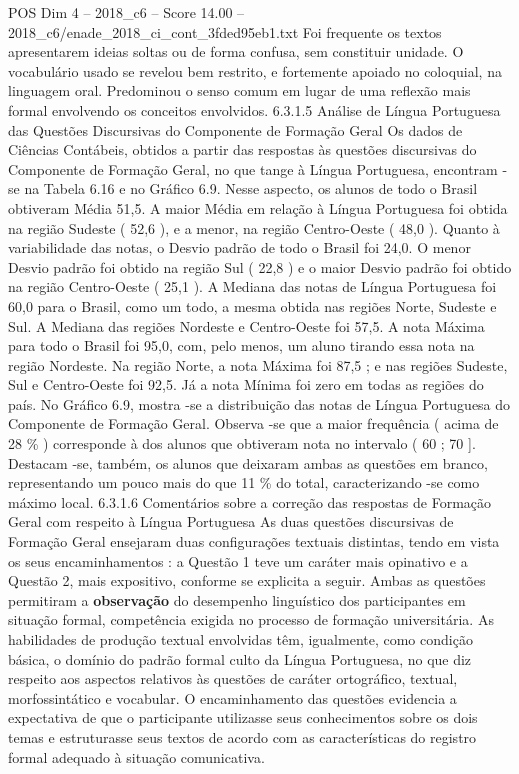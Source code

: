 \begin{textsample}{POS Dim 4 – 2018\_c6 – Score 14.00 – 2018\_c6/enade\_2018\_ci\_cont\_3fded95eb1.txt}
Foi frequente os textos apresentarem ideias soltas ou de forma confusa, sem constituir unidade.
O vocabulário usado se revelou bem restrito, e fortemente apoiado no coloquial, na linguagem oral.
Predominou o senso comum em lugar de uma reflexão mais formal envolvendo os conceitos envolvidos. 6.3.1.5 Análise de Língua Portuguesa das Questões Discursivas do Componente de Formação Geral Os dados de Ciências Contábeis, obtidos a partir das respostas às questões discursivas do Componente de Formação Geral, no que tange à Língua Portuguesa, encontram -se na Tabela 6.16 e no Gráfico 6.9.
Nesse aspecto, os alunos de todo o Brasil obtiveram Média 51,5.
A maior Média em relação à Língua Portuguesa foi obtida na região Sudeste ( 52,6 ), e a menor, na região Centro-Oeste ( 48,0 ).
Quanto à variabilidade das notas, o Desvio padrão de todo o Brasil foi 24,0.
O menor Desvio padrão foi obtido na região Sul ( 22,8 ) e o maior Desvio padrão foi obtido na região Centro-Oeste ( 25,1 ).
A Mediana das notas de Língua Portuguesa foi 60,0 para o Brasil, como um todo, a mesma obtida nas regiões Norte, Sudeste e Sul.
A Mediana das regiões Nordeste e Centro-Oeste foi 57,5.
A nota Máxima para todo o Brasil foi 95,0, com, pelo menos, um aluno tirando essa nota na região Nordeste.
Na região Norte, a nota Máxima foi 87,5 ; e nas regiões Sudeste, Sul e Centro-Oeste foi 92,5.
Já a nota Mínima foi zero em todas as regiões do país.
No Gráfico 6.9, mostra -se a distribuição das notas de Língua Portuguesa do Componente de Formação Geral.
Observa -se que a maior frequência ( acima de 28 \% ) corresponde à dos alunos que obtiveram nota no intervalo ( 60 ; 70 ].
Destacam -se, também, os alunos que deixaram ambas as questões em branco, representando um pouco mais do que 11 \% do total, caracterizando -se como máximo local. 6.3.1.6 Comentários sobre a correção das respostas de Formação Geral com respeito à Língua Portuguesa As duas questões discursivas de Formação Geral ensejaram duas configurações textuais distintas, tendo em vista os seus encaminhamentos : a Questão 1 teve um caráter mais opinativo e a Questão 2, mais expositivo, conforme se explicita a seguir.
Ambas as questões permitiram a \textbf{observação} do desempenho linguístico dos participantes em situação formal, competência exigida no processo de formação universitária.
As habilidades de produção textual envolvidas têm, igualmente, como condição básica, o domínio do padrão formal culto da Língua Portuguesa, no que diz respeito aos aspectos relativos às questões de caráter ortográfico, textual, morfossintático e vocabular.
O encaminhamento das questões evidencia a expectativa de que o participante utilizasse seus conhecimentos sobre os dois temas e estruturasse seus textos de acordo com as características do registro formal adequado à situação comunicativa.

\end{textsample}
